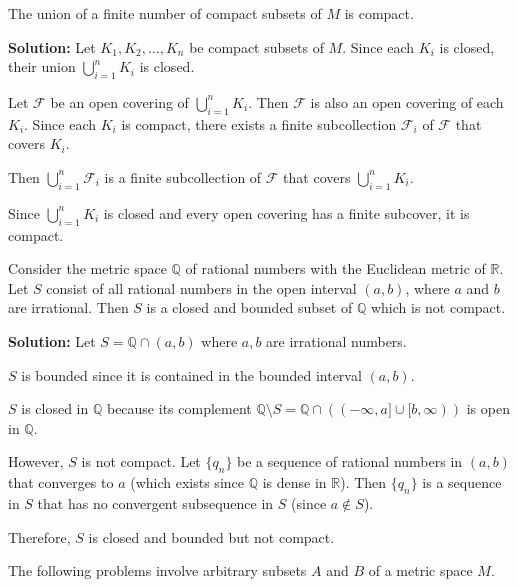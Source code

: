 \begin{problembox}
The union of a finite number of compact subsets of \( M \) is compact.
\end{problembox}

\textbf{Solution:} Let $K_1, K_2, \ldots, K_n$ be compact subsets of $M$. Since each $K_i$ is closed, their union $\bigcup_{i=1}^n K_i$ is closed.

Let $\mathcal{F}$ be an open covering of $\bigcup_{i=1}^n K_i$. Then $\mathcal{F}$ is also an open covering of each $K_i$. Since each $K_i$ is compact, there exists a finite subcollection $\mathcal{F}_i$ of $\mathcal{F}$ that covers $K_i$.

Then $\bigcup_{i=1}^n \mathcal{F}_i$ is a finite subcollection of $\mathcal{F}$ that covers $\bigcup_{i=1}^n K_i$.

Since $\bigcup_{i=1}^n K_i$ is closed and every open covering has a finite subcover, it is compact.

\begin{problembox}
Consider the metric space \( \mathbb{Q} \) of rational numbers with the Euclidean metric of \( \mathbb{R} \). Let \( S \) consist of all rational numbers in the open interval \((a, b)\), where \( a \) and \( b \) are irrational. Then \( S \) is a closed and bounded subset of \( \mathbb{Q} \) which is not compact.
\end{problembox}

\textbf{Solution:} Let $S = \mathbb{Q} \cap (a,b)$ where $a, b$ are irrational numbers.

$S$ is bounded since it is contained in the bounded interval $(a,b)$.

$S$ is closed in $\mathbb{Q}$ because its complement $\mathbb{Q} \setminus S = \mathbb{Q} \cap ((-\infty,a] \cup [b,\infty))$ is open in $\mathbb{Q}$.

However, $S$ is not compact. Let $\{q_n\}$ be a sequence of rational numbers in $(a,b)$ that converges to $a$ (which exists since $\mathbb{Q}$ is dense in $\mathbb{R}$). Then $\{q_n\}$ is a sequence in $S$ that has no convergent subsequence in $S$ (since $a \notin S$).

Therefore, $S$ is closed and bounded but not compact.

\begin{problembox}
The following problems involve arbitrary subsets \( A \) and \( B \) of a metric space \( M \).
\end{problembox}

